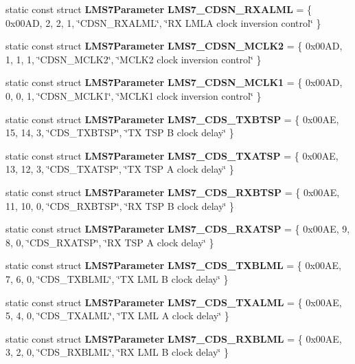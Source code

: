 \begin{DoxyCompactItemize}
\item 
static const struct {\bf L\+M\+S7\+Parameter} {\bf L\+M\+S7\+\_\+\+C\+D\+S\+N\+\_\+\+R\+X\+A\+L\+ML} = \{ 0x00\+A\+D, 2, 2, 1, \char`\"{}\+C\+D\+S\+N\+\_\+\+R\+X\+A\+L\+M\+L\char`\"{}, \char`\"{}\+R\+X L\+M\+L\+A clock inversion control\char`\"{} \}
\item 
static const struct {\bf L\+M\+S7\+Parameter} {\bf L\+M\+S7\+\_\+\+C\+D\+S\+N\+\_\+\+M\+C\+L\+K2} = \{ 0x00\+A\+D, 1, 1, 1, \char`\"{}\+C\+D\+S\+N\+\_\+\+M\+C\+L\+K2\char`\"{}, \char`\"{}\+M\+C\+L\+K2 clock inversion control\char`\"{} \}
\item 
static const struct {\bf L\+M\+S7\+Parameter} {\bf L\+M\+S7\+\_\+\+C\+D\+S\+N\+\_\+\+M\+C\+L\+K1} = \{ 0x00\+A\+D, 0, 0, 1, \char`\"{}\+C\+D\+S\+N\+\_\+\+M\+C\+L\+K1\char`\"{}, \char`\"{}\+M\+C\+L\+K1 clock inversion control\char`\"{} \}
\item 
static const struct {\bf L\+M\+S7\+Parameter} {\bf L\+M\+S7\+\_\+\+C\+D\+S\+\_\+\+T\+X\+B\+T\+SP} = \{ 0x00\+A\+E, 15, 14, 3, \char`\"{}\+C\+D\+S\+\_\+\+T\+X\+B\+T\+S\+P\char`\"{}, \char`\"{}\+T\+X T\+S\+P B clock delay\char`\"{} \}
\item 
static const struct {\bf L\+M\+S7\+Parameter} {\bf L\+M\+S7\+\_\+\+C\+D\+S\+\_\+\+T\+X\+A\+T\+SP} = \{ 0x00\+A\+E, 13, 12, 3, \char`\"{}\+C\+D\+S\+\_\+\+T\+X\+A\+T\+S\+P\char`\"{}, \char`\"{}\+T\+X T\+S\+P A clock delay\char`\"{} \}
\item 
static const struct {\bf L\+M\+S7\+Parameter} {\bf L\+M\+S7\+\_\+\+C\+D\+S\+\_\+\+R\+X\+B\+T\+SP} = \{ 0x00\+A\+E, 11, 10, 0, \char`\"{}\+C\+D\+S\+\_\+\+R\+X\+B\+T\+S\+P\char`\"{}, \char`\"{}\+R\+X T\+S\+P B clock delay\char`\"{} \}
\item 
static const struct {\bf L\+M\+S7\+Parameter} {\bf L\+M\+S7\+\_\+\+C\+D\+S\+\_\+\+R\+X\+A\+T\+SP} = \{ 0x00\+A\+E, 9, 8, 0, \char`\"{}\+C\+D\+S\+\_\+\+R\+X\+A\+T\+S\+P\char`\"{}, \char`\"{}\+R\+X T\+S\+P A clock delay\char`\"{} \}
\item 
static const struct {\bf L\+M\+S7\+Parameter} {\bf L\+M\+S7\+\_\+\+C\+D\+S\+\_\+\+T\+X\+B\+L\+ML} = \{ 0x00\+A\+E, 7, 6, 0, \char`\"{}\+C\+D\+S\+\_\+\+T\+X\+B\+L\+M\+L\char`\"{}, \char`\"{}\+T\+X L\+M\+L B clock delay\char`\"{} \}
\item 
static const struct {\bf L\+M\+S7\+Parameter} {\bf L\+M\+S7\+\_\+\+C\+D\+S\+\_\+\+T\+X\+A\+L\+ML} = \{ 0x00\+A\+E, 5, 4, 0, \char`\"{}\+C\+D\+S\+\_\+\+T\+X\+A\+L\+M\+L\char`\"{}, \char`\"{}\+T\+X L\+M\+L A clock delay\char`\"{} \}
\item 
static const struct {\bf L\+M\+S7\+Parameter} {\bf L\+M\+S7\+\_\+\+C\+D\+S\+\_\+\+R\+X\+B\+L\+ML} = \{ 0x00\+A\+E, 3, 2, 0, \char`\"{}\+C\+D\+S\+\_\+\+R\+X\+B\+L\+M\+L\char`\"{}, \char`\"{}\+R\+X L\+M\+L B clock delay\char`\"{} \}

\end{DoxyCompactItemize}
